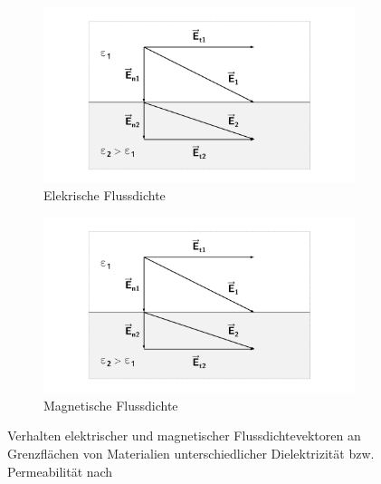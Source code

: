 \begin{figure}[ht]
    \centering
    \begin{subfigure}[c]{0.4\textwidth}
        \includegraphics[page = 3, width=\textwidth, trim = 4.8cm 1cm 4.8cm 1cm, clip]{Abbildungen/Kapitel2/Feldvektoren_an_Grenzflaechen.pdf}
        \caption{Elekrische Flussdichte}\label{subfig:2_Elektrische_Flussdichte_an_Grenzflaeche}
    \end{subfigure}
    \hspace{2cm}
    \begin{subfigure}[c]{0.4\textwidth}
        \includegraphics[page = 4, width=\textwidth, trim = 4.8cm 1cm 4.8cm 1cm, clip]{Abbildungen/Kapitel2/Feldvektoren_an_Grenzflaechen.pdf}
        \caption{Magnetische Flussdichte}\label{subfig:2_Magnetische_Flussdichte_an_Grenzflaeche}
    \end{subfigure}
    \caption{Verhalten elektrischer und magnetischer Flussdichtevektoren an Grenzflächen von \mbox{Materialien} unterschiedlicher Dielektrizität bzw. Permeabilität nach~\cite{EM_Schirmung}}
    \label{fig:2_Flussdichten_an_Grenzflaechen}
\end{figure}

